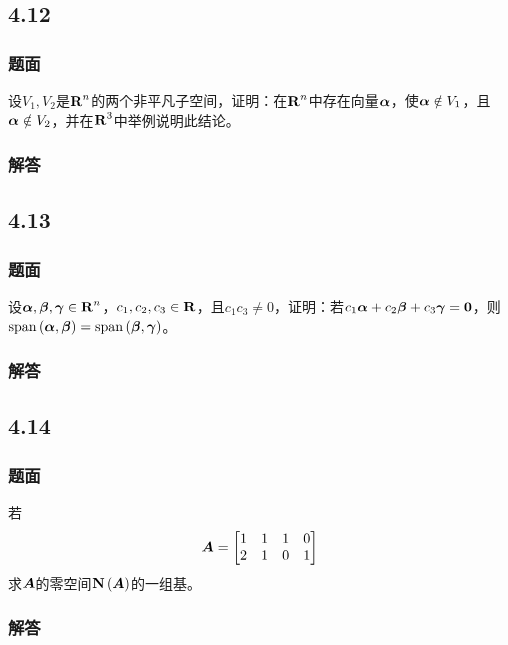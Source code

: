 \documentclass{beamer}
\begin{document}
\subsection*{4.12}
\begin{frame}
    \frametitle{题面}

    设\(V_1,V_2\)是\(\boldsymbol{\mathrm{R}}^n\)的两个非平凡子空间，证明：在\(\boldsymbol{\mathrm{R}}^n\)中存在向量\(\boldsymbol{\alpha}\)，使\(\boldsymbol{\alpha}\notin V_1\)，且\(\boldsymbol{\alpha}\notin V_2\)，并在\(\boldsymbol{\mathrm{R}}^3\)中举例说明此结论。

\end{frame}

\begin{frame}
    \frametitle{解答}



\end{frame}

\subsection*{4.13}
\begin{frame}
    \frametitle{题面}

    设\(\boldsymbol{\alpha},\boldsymbol{\beta},\boldsymbol{\gamma}\in\boldsymbol{\mathrm{R}}^n\)，\(c_1,c_2,c_3\in\boldsymbol{\mathrm{R}}\)，且\(c_1c_3\neq0\)，证明：若\(c_1\boldsymbol{\alpha}+c_2\boldsymbol{\beta}+c_3\boldsymbol{\gamma}=\boldsymbol{0}\)，则\(\mathrm{span}\left( \boldsymbol{\alpha},\boldsymbol{\beta} \right)=\mathrm{span}\left( \boldsymbol{\beta},\boldsymbol{\gamma} \right)\)。

\end{frame}

\begin{frame}
    \frametitle{解答}



\end{frame}

\subsection*{4.14}
\begin{frame}
    \frametitle{题面}

    若
    \begin{equation*}
        \boldsymbol{A}=\begin{bmatrix}1&1&1&0\\2&1&0&1\end{bmatrix}
    \end{equation*}
    求\(\boldsymbol{A}\)的零空间\(\boldsymbol{\mathrm{N}}\left( \boldsymbol{A} \right)\)的一组基。

\end{frame}

\begin{frame}
    \frametitle{解答}



\end{frame}
\end{document}
